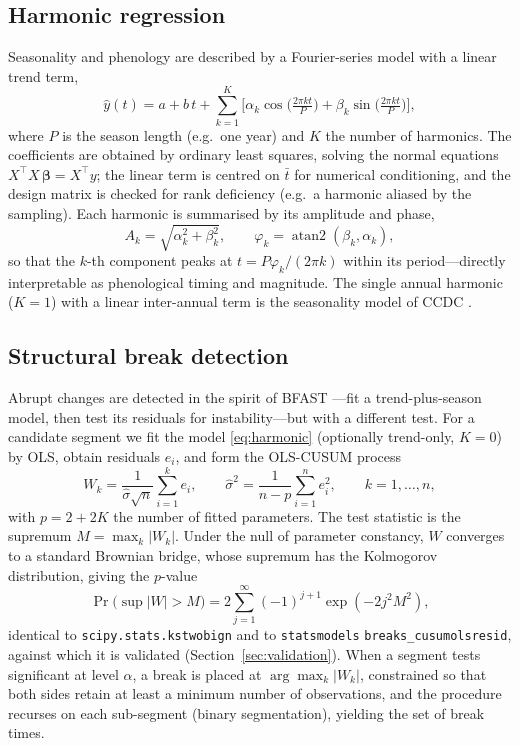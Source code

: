 \documentclass[review]{elsarticle}
\begin{document}
\subsection{Harmonic regression}
\label{sec:harmonic}
Seasonality and phenology are described by a Fourier-series model with a linear
trend term,
\begin{equation}
\label{eq:harmonic}
\hat y(t) = a + b\,t
  + \sum_{k=1}^{K} \Big[ \alpha_k \cos\!\Big(\tfrac{2\pi k t}{P}\Big)
                       + \beta_k  \sin\!\Big(\tfrac{2\pi k t}{P}\Big) \Big],
\end{equation}
where $P$ is the season length (e.g.\ one year) and $K$ the number of harmonics.
The coefficients are obtained by ordinary least squares, solving the normal
equations $X^{\!\top}\!X\,\boldsymbol\beta = X^{\!\top} y$; the linear term is
centred on $\bar t$ for numerical conditioning, and the design matrix is
checked for rank deficiency (e.g.\ a harmonic aliased by the sampling). Each
harmonic is summarised by its amplitude and phase,
\begin{equation}
A_k = \sqrt{\alpha_k^2 + \beta_k^2}, \qquad
\varphi_k = \operatorname{atan2}(\beta_k, \alpha_k),
\end{equation}
so that the $k$-th component peaks at $t = P\varphi_k/(2\pi k)$ within its
period---directly interpretable as phenological timing and magnitude. The single
annual harmonic ($K=1$) with a linear inter-annual term is the seasonality model
of CCDC \citep{zhu2014ccdc}.

\subsection{Structural break detection}
\label{sec:breaks}
Abrupt changes are detected in the spirit of BFAST
\citep{verbesselt2010bfast}---fit a trend-plus-season model, then test its
residuals for instability---but with a different test. For a candidate segment we
fit the model \eqref{eq:harmonic} (optionally trend-only, $K=0$) by OLS, obtain
residuals $e_i$, and form the OLS-CUSUM process \citep{brown1975,ploberger1992}
\begin{equation}
W_k = \frac{1}{\hat\sigma \sqrt{n}} \sum_{i=1}^{k} e_i,
\qquad
\hat\sigma^2 = \frac{1}{n-p}\sum_{i=1}^{n} e_i^2,
\qquad k = 1,\dots,n,
\end{equation}
with $p = 2 + 2K$ the number of fitted parameters. The test statistic is the
supremum $M = \max_k |W_k|$. Under the null of parameter constancy, $W$ converges
to a standard Brownian bridge, whose supremum has the Kolmogorov distribution,
giving the $p$-value
\begin{equation}
\label{eq:bb}
\Pr\!\big(\sup|W| > M\big)
  = 2 \sum_{j=1}^{\infty} (-1)^{j+1} \exp(-2 j^2 M^2),
\end{equation}
identical to \texttt{scipy.stats.kstwobign} and to
\texttt{statsmodels} \texttt{breaks\_cusumolsresid}, against which it is validated
(Section~\ref{sec:validation}). When a segment tests significant at level
$\alpha$, a break is placed at $\arg\max_k |W_k|$, constrained so that both sides
retain at least a minimum number of observations, and the procedure recurses on
each sub-segment (binary segmentation), yielding the set of break times.
\end{document}
